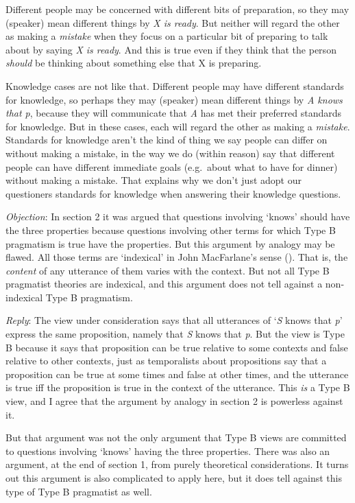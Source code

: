 \documentclass[
  11pt,
  letterpaper,
  DIV=11,
  numbers=noendperiod,
  twoside]{scrartcl}
\begin{document}
Different people may be concerned with different bits of preparation, so
they may (speaker) mean different things by \emph{X is ready}. But
neither will regard the other as making a \emph{mistake} when they focus
on a particular bit of preparing to talk about by saying \emph{X is
ready}. And this is true even if they think that the person
\emph{should} be thinking about something else that X is preparing.

Knowledge cases are not like that. Different people may have different
standards for knowledge, so perhaps they may (speaker) mean different
things by \emph{A knows that p}, because they will communicate that
\emph{A} has met their preferred standards for knowledge. But in these
cases, each will regard the other as making a \emph{mistake}. Standards
for knowledge aren't the kind of thing we say people can differ on
without making a mistake, in the way we do (within reason) say that
different people can have different immediate goals (e.g.~about what to
have for dinner) without making a mistake. That explains why we don't
just adopt our questioners standards for knowledge when answering their
knowledge questions.

\emph{Objection}: In section 2 it was argued that questions involving
`knows' should have the three properties because questions involving
other terms for which Type B pragmatism is true have the properties. But
this argument by analogy may be flawed. All those terms are `indexical'
in John MacFarlane's sense
(). That is, the
\emph{content} of any utterance of them varies with the context. But not
all Type B pragmatist theories are indexical, and this argument does not
tell against a non-indexical Type B pragmatism.

\emph{Reply}: The view under consideration says that all utterances of
`\emph{S} knows that \emph{p}' express the same proposition, namely that
\emph{S} knows that \emph{p}. But the view is Type B because it says
that proposition can be true relative to some contexts and false
relative to other contexts, just as temporalists about propositions say
that a proposition can be true at some times and false at other times,
and the utterance is true iff the proposition is true in the context of
the utterance. This \emph{is} a Type B view, and I agree that the
argument by analogy in section 2 is powerless against it.

But that argument was not the only argument that Type B views are
committed to questions involving `knows' having the three properties.
There was also an argument, at the end of section 1, from purely
theoretical considerations. It turns out this argument is also
complicated to apply here, but it does tell against this type of Type B
pragmatist as well.
\end{document}
